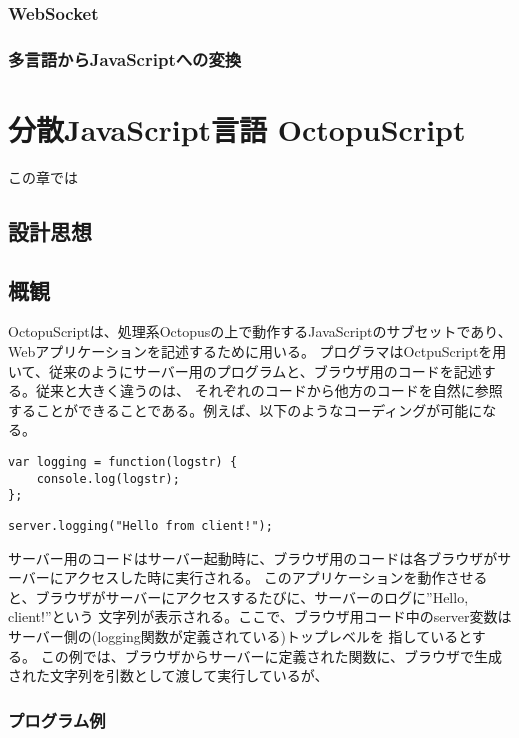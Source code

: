 \documentclass[a4j,12pt]{jreport}
\begin{document}
\subsection{WebSocket}
\subsection{多言語からJavaScriptへの変換}


\chapter{分散JavaScript言語 OctopuScript}
この章では
\section{設計思想}
\section{概観}

OctopuScriptは、処理系Octopusの上で動作するJavaScriptのサブセットであり、Webアプリケーションを記述するために用いる。
プログラマはOctpuScriptを用いて、従来のようにサーバー用のプログラムと、ブラウザ用のコードを記述する。従来と大きく違うのは、
それぞれのコードから他方のコードを自然に参照することができることである。例えば、以下のようなコーディングが可能になる。

\begin{lstlisting}[caption=サーバー用のOctopuScriptコード,label=ラベル]
var logging = function(logstr) {
	console.log(logstr);
};
\end{lstlisting}

\begin{lstlisting}[caption=ブラウザ用のOctopuScriptコード,label=ラベル]
server.logging("Hello from client!");
\end{lstlisting}

サーバー用のコードはサーバー起動時に、ブラウザ用のコードは各ブラウザがサーバーにアクセスした時に実行される。
このアプリケーションを動作させると、ブラウザがサーバーにアクセスするたびに、サーバーのログに''Hello, client!''という
文字列が表示される。ここで、ブラウザ用コード中のserver変数はサーバー側の(logging関数が定義されている)トップレベルを
指しているとする。
この例では、ブラウザからサーバーに定義された関数に、ブラウザで生成された文字列を引数として渡して実行しているが、

\subsection{プログラム例}
\end{document}

